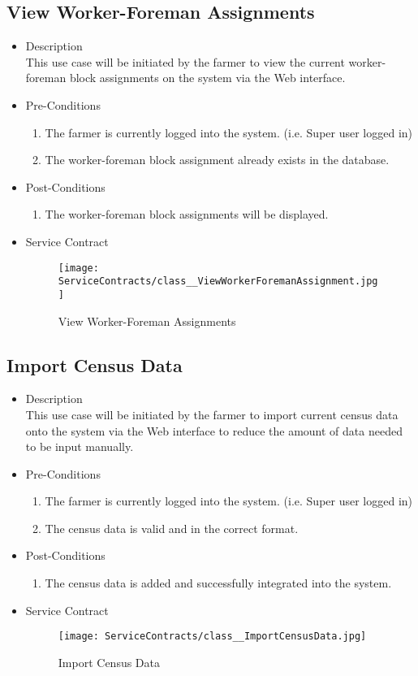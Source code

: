 \documentclass[11pt,fleqn]{book} %
\begin{document}
\subsection{View Worker-Foreman Assignments}
\begin{itemize}
	\item Description\\
	This use case will be initiated by the farmer to view the current worker-foreman block assignments on the system via the Web interface.
	\item Pre-Conditions
	\begin{enumerate}
		\item The farmer is currently logged into the system. (i.e. Super user logged in)
		\item The worker-foreman block assignment already exists in the database.		
	\end{enumerate}
	\item Post-Conditions
	\begin{enumerate}
		\item The worker-foreman block assignments will be displayed.
	\end{enumerate}
	\item Service Contract
	\begin{figure}
		\texttt{[image: ServiceContracts/class\_\_ViewWorkerForemanAssignment.jpg]}
		\caption{View Worker-Foreman Assignments}
	\end{figure}
\end{itemize}

\subsection{Import Census Data}
\begin{itemize}
	\item Description\\
	This use case will be initiated by the farmer to import current census data onto the system via the Web interface to reduce the amount of data needed to be input manually.
	\item Pre-Conditions
	\begin{enumerate}
		\item The farmer is currently logged into the system. (i.e. Super user logged in)
		\item The census data is valid and in the correct format.								
	\end{enumerate}
	\item Post-Conditions
	\begin{enumerate}
		\item The census data is added and successfully integrated into the system.
	\end{enumerate}
	\item Service Contract
	\begin{figure}
		\texttt{[image: ServiceContracts/class\_\_ImportCensusData.jpg]}
		\caption{Import Census Data}
	\end{figure}
\end{itemize}
\end{document}
